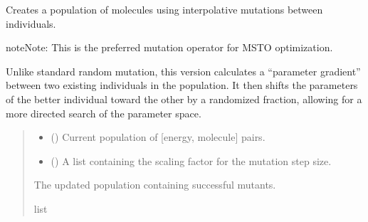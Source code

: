 \documentclass[letterpaper,10pt,english]{sphinxmanual}
\begin{document}

\begin{fulllineitems}
\label{\detokenize{api:MSTOOptpar.Mutate_v2}}
\pysigstartsignatures
\pysiglinewithargsret
{}
{\sphinxparamcomma {}}
{}
\pysigstopsignatures
\sphinxAtStartPar
Creates a population of molecules using interpolative mutations between individuals.

\begin{sphinxadmonition}{note}{Note:}
\sphinxAtStartPar
This is the preferred mutation operator for MSTO optimization.
\end{sphinxadmonition}

\sphinxAtStartPar
Unlike standard random mutation, this version calculates a “parameter gradient”
between two existing individuals in the population. It then shifts
the parameters of the better individual toward the other by a randomized
fraction, allowing for a more directed search of the parameter space.
\begin{quote}\begin{description}
\begin{itemize}
\item {} 
\sphinxAtStartPar
{} () \textendash{} Current population of {[}energy, molecule{]} pairs.

\item {} 
\sphinxAtStartPar
{} () \textendash{} A list containing the scaling factor for the mutation step size.

\end{itemize}

\sphinxAtStartPar
The updated population containing successful mutants.

\sphinxAtStartPar
list

\end{description}\end{quote}

\end{fulllineitems}

\end{document}
